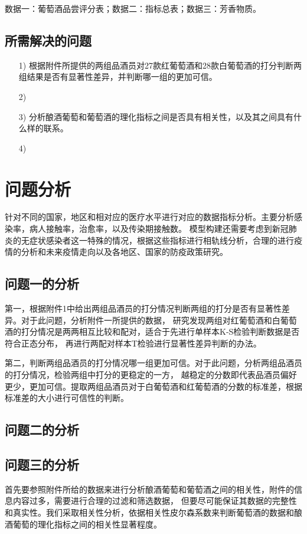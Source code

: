 \documentclass[UTF8]{ctexart}
\begin{document}
		数据一：葡萄酒品尝评分表；数据二：指标总表；数据三：芳香物质。
		\subsection{所需解决的问题}
		\begin{itemize}
			\item [{1)}]{根据附件所提供的两组品酒员对27款红葡萄酒和28款白葡萄酒的打分判断两组结果是否有显著性差异，并判断哪一组的更加可信。 }
			\item [2)]{}
			\item [3)]{分析酿酒葡萄和葡萄酒的理化指标之间是否具有相关性，以及其之间具有什么样的联系。}
			\item [4)]{}
		\end{itemize}



	\section{问题分析}
		针对不同的国家，地区和相对应的医疗水平进行对应的数据指标分析。主要分析感染率，病人接触率，治愈率，以及传染期接触数。
		模型构建还需要考虑到新冠肺炎的无症状感染者这一特殊的情况，根据这些指标进行相轨线分析，合理的进行疫情的分析和未来疫情走向以及各地区、国家的防疫政策研究。
		\subsection{问题一的分析}
		第一，根据附件1中给出两组品酒员的打分情况判断两组的打分是否有显著性差异。对于此问题，分析附件一所提供的数据，
		研究发现两组对红葡萄酒和白葡萄酒的打分情况是两两相互比较和配对，适合于先进行单样本K-S检验判断数据是否符合正态分布，
		再进行两配对样本T检验进行显著性差异判断的办法。

		第二，判断两组品酒员的打分情况哪一组更加可信。对于此问题，分析两组品酒员的打分情况，检验两组中打分的更稳定的一方，
		越稳定的分数即代表品酒员偏好更少，更加可信。提取两组品酒员对于白葡萄酒和红葡萄酒的分数的标准差，根据标准差的大小进行可信性的判断。

		\subsection{问题二的分析}
		\subsection{问题三的分析}
		首先要参照附件所给的数据来进行分析酿酒葡萄和葡萄酒之间的相关性，附件的信息内容过多，需要进行合理的过滤和筛选数据，
		但要尽可能保证其数据的完整性和真实性。我们采取相关性分析，依据相关性皮尔森系数来判断葡萄酒的数据和酿酒葡萄的理化指标之间的相关性显著程度。
\end{document}
